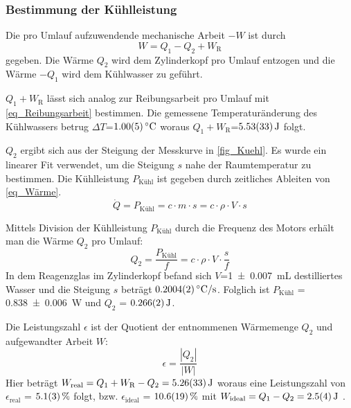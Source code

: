 \documentclass[
	a4paper,
	12pt,
	pagesize,
	ngerman
]{scrartcl}
\begin{document}
	\subsubsection{Bestimmung der Kühlleistung} \label{sssec_Kühlleistung}
	Die pro Umlauf aufzuwendende mechanische Arbeit $-W$ ist durch
	\begin{equation}
	W =  Q_1 - Q_2 + W_\text{R}
	\end{equation}
	gegeben.
	Die Wärme $Q_2$ wird dem Zylinderkopf pro Umlauf entzogen und die Wärme $-Q_1$ wird dem Kühlwasser zu geführt.
	
	$Q_1+W_\text{R}$ lässt sich analog zur Reibungsarbeit pro Umlauf mit \cref{eq_Reibungsarbeit} bestimmen.	
	Die gemessene Temperaturänderung des Kühlwassers betrug $\Delta{T}$=$\SI{1,0+-0,05}{\degreeCelsius}$ woraus $Q_1+W_\text{R}$=$\SI{5,53+-0,33}{J}$ folgt.
	
	$Q_2$ ergibt sich aus der Steigung der Messkurve in \cref{fig_Kuehl}.
	Es wurde ein linearer Fit verwendet, um die Steigung $s$ nahe der Raumtemperatur zu bestimmen.
	Die Kühlleistung $P_\text{Kühl}$ ist gegeben durch zeitliches Ableiten von \cref{eq_Wärme}.
	\begin{equation}
	\dot{Q} = P_\text{Kühl} = c \cdot m \cdot s = c \cdot \rho \cdot V \cdot s 
	\label{eq_Kühlleistung}
	\end{equation}
	
	Mittels Division der Kühlleistung $P_\text{Kühl}$ durch die Frequenz des Motors erhält man die Wärme $Q_2$ pro Umlauf:
	\begin{equation}
	Q_2 = \frac{P_\text{Kühl}}{f} = c \cdot \rho \cdot V \cdot \frac{s}{f}	
	\end{equation}
	In dem Reagenzglas im Zylinderkopf befand sich $V$=\SI{1+- 0,007}{mL} destilliertes Wasser und die Steigung $s$ beträgt $\SI{0,2004+-0,0002}{\degreeCelsius/s}$.
	Folglich ist $P_\text{Kühl}$ = \SI{0,838+-0,006}{W} und $Q_2$ = $\SI{0,266+-0,002}{J}$.
	
	Die Leistungszahl $\epsilon$ ist der Quotient der entnommenen Wärmemenge $Q_2$ und aufgewandter Arbeit $W$:
	\begin{equation}
		\epsilon = \frac{|Q_2|}{|W|}
		\label{eq_Leistungszahl}
	\end{equation}
	Hier beträgt $W_\text{real}=Q_1+W_\text{R}-Q_2=\SI{5,26+-0,33}{J}$ woraus eine Leistungszahl von $\epsilon_\text{real}$ = $\SI{5,1 +- 0,3}{\%}$ folgt, bzw. $\epsilon_\text{ideal}$ = $\SI{10,6 +- 1,9}{\%}$ mit  $W_\text{ideal}=Q_1-Q_2=\SI{2,5+-0,4}{J}$ .
	
\end{document}
